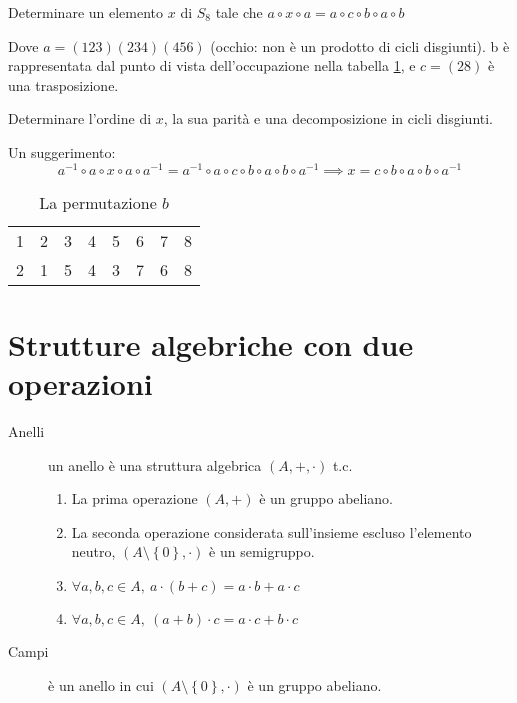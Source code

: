 \begin{esercizio}
Determinare un elemento $x$ di $S_8$ tale che $a \circ x \circ a = a \circ c \circ b \circ a \circ b$

Dove $a = (1 2 3) (2 3 4) (4 5 6)$ (occhio: non \`e un prodotto di cicli disgiunti). b \`e rappresentata dal punto di vista dell'occupazione nella tabella \ref{tab:esercizio_b}, e $c = (2 8)$ \`e una trasposizione.

Determinare l'ordine di $x$, la sua parit\`a e una decomposizione in cicli disgiunti.

Un suggerimento:
\[
a^{-1} \circ a \circ x \circ a \circ a^{-1} = a^{-1} \circ a \circ c \circ b \circ a \circ b \circ a^{-1} \implies x = c \circ b \circ a \circ b \circ a^{-1}
\]
\end{esercizio}

\begin{table}[ht]
\centering
\begin{tabular}{*{8}{c}}
1 & 2 & 3 & 4 & 5 & 6 & 7 & 8 \\
2 & 1 & 5 & 4 & 3 & 7 & 6 & 8
\end{tabular}
\caption{\label{tab:esercizio_b}La permutazione $b$}
\end{table}

\section{Strutture algebriche con due operazioni}

\begin{description}
    \item[Anelli] un anello \`e una struttura algebrica $(A, +, \cdot)$ t.c. 
    \begin{enumerate}
        \item La prima operazione $\left( A, + \right)$ \`e un gruppo abeliano.
        \item La seconda operazione considerata sull'insieme escluso l'elemento neutro, $(A \setminus \left \{ 0 \right \}, \cdot )$ \`e un semigruppo.
        \item $ \forall a, b, c \in A , \ a \cdot (b + c) = a \cdot b + a \cdot c $
        \item $ \forall a, b, c \in A , \ (a + b) \cdot c = a \cdot c + b \cdot c $
    \end{enumerate}
    \item[Campi] \`e un anello in cui $( A \setminus \left \{ 0 \right \}, \cdot )$ \`e un gruppo abeliano.
\end{description}

